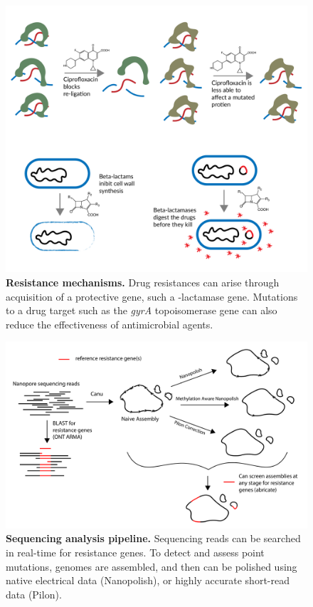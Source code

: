 \begin{figure}[!ht]
\centering
\includegraphics[width = .81\linewidth,keepaspectratio]{figure/rescartoons.pdf}
\caption[Resistance mechanisms]{{\bf Resistance mechanisms.} Drug resistances can arise through acquisition of a protective gene, such a {\textbeta}-lactamase gene. Mutations to a drug target such as the \textit{gyrA} topoisomerase gene can also reduce the effectiveness of antimicrobial agents. }
\label{fig:rescartoons}
\end{figure}


\begin{figure}[!ht]
\centering
\includegraphics[width = 1\linewidth,keepaspectratio]{figure/pipeline.pdf}
\caption[Sequencing analysis pipeline]{{\bf Sequencing analysis pipeline.} Sequencing reads can be searched in real-time for resistance genes. To detect and assess point mutations, genomes are assembled, and then can be polished using native electrical data (Nanopolish), or highly accurate short-read data (Pilon). }
\label{fig:pipeline}
\end{figure}


